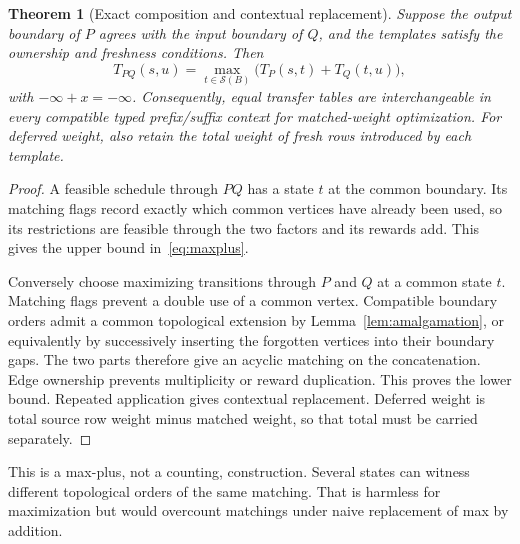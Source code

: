 \documentclass[11pt,a4paper]{article}
\newtheorem{theorem}{Theorem}[section]
\theoremstyle{definition}
\theoremstyle{remark}
\newcommand{\mi}{-\infty}
\newcommand{\calS}{\mathcal S}
\begin{document}
\begin{theorem}[Exact composition and contextual replacement]
\label{thm:composition}
Suppose the output boundary of $P$ agrees with the input boundary of $Q$,
and the templates satisfy the ownership and freshness conditions. Then
\begin{equation}
 T_{PQ}(s,u)=\max_{t\in\calS(B)}\bigl(T_P(s,t)+T_Q(t,u)\bigr),
 \label{eq:maxplus}
\end{equation}
with $\mi+x=\mi$. Consequently, equal transfer tables are interchangeable
in every compatible typed prefix/suffix context for matched-weight
optimization. For deferred weight, also retain the total weight of fresh
rows introduced by each template.
\end{theorem}
\begin{proof}
A feasible schedule through $PQ$ has a state $t$ at the common boundary.
Its matching flags record exactly which common vertices have already
been used, so its restrictions are feasible through the two factors and
its rewards add. This gives the upper bound in~\eqref{eq:maxplus}.

Conversely choose maximizing transitions through $P$ and $Q$ at a common
state $t$. Matching flags prevent a double use of a common vertex.
Compatible boundary orders admit a common topological extension by
Lemma~\ref{lem:amalgamation}, or equivalently by successively inserting the
forgotten vertices into their boundary gaps. The two parts therefore give
an acyclic matching on the concatenation. Edge ownership prevents
multiplicity or reward duplication. This proves the lower bound. Repeated
application gives contextual replacement. Deferred weight is total source
row weight minus matched weight, so that total must be carried separately.
\end{proof}

This is a max-plus, not a counting, construction. Several states can
witness different topological orders of the same matching. That is harmless
for maximization but would overcount matchings under naive replacement of
max by addition.
\end{document}
